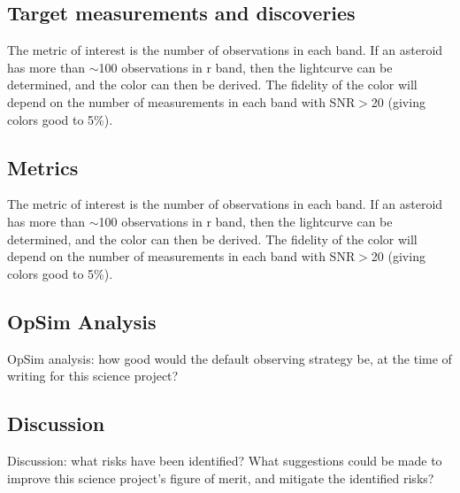 
\subsection{Target measurements and discoveries}
\label{sec:\secname:targets}


The metric of interest is the number
of observations in each band. If an asteroid has
more than $\sim$100 observations in r band,
then the lightcurve can be determined, and the
color can then be derived. The fidelity of the color
will depend on the number of measurements in
each band with SNR$>$20 (giving colors good to
5\%).




\subsection{Metrics}
\label{sec:\secname:metrics}

The metric of interest is the number
of observations in each band. If an asteroid has
more than $\sim$100 observations in r band,
then the lightcurve can be determined, and the
color can then be derived. The fidelity of the color
will depend on the number of measurements in
each band with SNR$>$20 (giving colors good to
5\%).




\subsection{OpSim Analysis}
\label{sec:\secname:analysis}

OpSim analysis: how good would the default observing strategy be, at
the time of writing for this science project?



\subsection{Discussion}
\label{sec:\secname:discussion}

Discussion: what risks have been identified? What suggestions could be
made to improve this science project's figure of merit, and mitigate
the identified risks?

